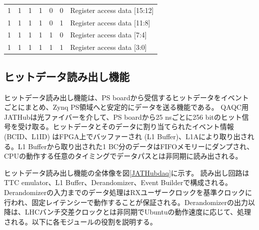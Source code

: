 \begin{table}[]
\begin{tabular}{|cccccc|l|}
    \multicolumn{1}{|c}{1} & 1                      & 1                      & 1                      & 0                      & 0 & Register access data {[}15:12{]}       \\  
    \multicolumn{1}{|c}{1} & 1                      & 1                      & 1                      & 0                      & 1 & Register access data {[}11:8{]}        \\  
    \multicolumn{1}{|c}{1} & 1                      & 1                      & 1                      & 1                      & 0 & Register access data {[}7:4{]}         \\  
    \multicolumn{1}{|c}{1} & 1                      & 1                      &1                       & 1                      & 1 & Register access data {[}3:0{]}         \\  \hline
    \end{tabular}
    \end{table}

\subsection*{ヒットデータ読み出し機能}
\label{subsubsec_DAQ}
ヒットデータ読み出し機能は、PS boardから受信するヒットデータをイベントごとにまとめ、Zynq PS領域へと安定的にデータを送る機能である。
QAQC用JATHubは光ファイバーを介して、PS boardから25 nsごとに256 bitのヒット信号を受け取る。ヒットデータとそのデータに割り当てられたイベント情報 (BCID、L1ID) はFPGA上でバッファーされ (L1 Buffer)、L1Aにより取り出される。L1 Bufferから取り出された1 BC分のデータはFIFOメモリーにダンプされ、CPUの動作する任意のタイミングでデータパスとは非同期に読み出される。

ヒットデータ読み出し機能の全体像を図\ref{JATHubdaq}に示す。
読み出し回路はTTC emulator、L1 Buffer、Derandomizer、Event Builderで構成される。Derandomizerの入力までのデータ処理はRXユーザークロックを基準クロックに行われ、固定レイテンシーで動作することが保証される。Derandomizerの出力以降は、LHCバンチ交差クロックとは非同期でUbuntuの動作速度に応じて、処理される。以下に各モジュールの役割を説明する。

